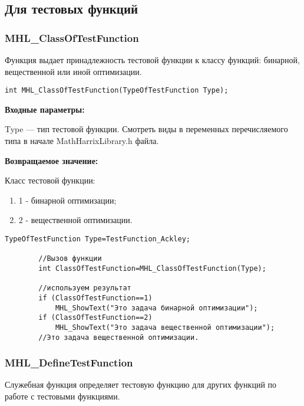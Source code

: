 \documentclass[a4paper,12pt]{article}
\begin{document}
\subsection{Для тестовых функций}

\subsubsection{MHL\_ClassOfTestFunction}\label{MHL_ClassOfTestFunction}

Функция выдает принадлежность тестовой функции к классу функций: бинарной, вещественной или иной оптимизации.


\begin{lstlisting}[label=code_syntax_MHL_ClassOfTestFunction,caption=Синтаксис]
int MHL_ClassOfTestFunction(TypeOfTestFunction Type);
\end{lstlisting}

\textbf{Входные параметры:}

Type --- тип тестовой функции. Смотреть виды в переменных перечисляемого типа в начале MathHarrixLibrary.h файла.

\textbf{Возвращаемое значение:}

Класс тестовой функции:

\begin{enumerate}
\item 1 - бинарной оптимизации;
\item 2 - вещественной оптимизации.
\end{enumerate}


\begin{lstlisting}[label=code_use_MHL_ClassOfTestFunction,caption=Пример использования]
        TypeOfTestFunction Type=TestFunction_Ackley;

        //Вызов функции
        int ClassOfTestFunction=MHL_ClassOfTestFunction(Type);

        //используем результат
        if (ClassOfTestFunction==1)
            MHL_ShowText("Это задача бинарной оптимизации");
        if (ClassOfTestFunction==2)
            MHL_ShowText("Это задача вещественной оптимизации");
        //Это задача вещественной оптимизации.
\end{lstlisting}

\subsubsection{MHL\_DefineTestFunction}\label{MHL_DefineTestFunction}

Служебная функция определяет тестовую функцию для других функций по работе с тестовыми функциями.
\end{document}
